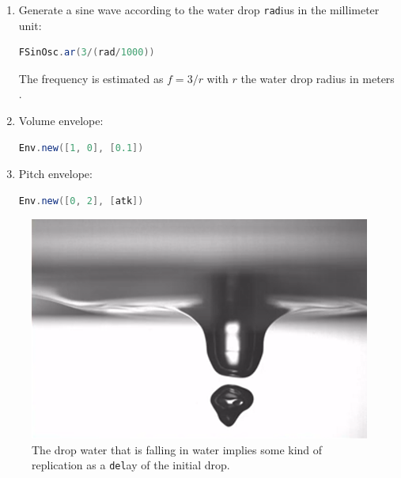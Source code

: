 \begin{enumerate}
  \item Generate a sine wave according to the water drop \texttt{rad}ius in the millimeter unit:
\begin{lstlisting}[basicstyle=\footnotesize\ttfamily,language=Java]
FSinOsc.ar(3/(rad/1000))
\end{lstlisting}  
The frequency is estimated as $f=3/r$ with $r$ the water drop radius in meters \citep{kvdd}.

  \item Volume envelope:
\begin{lstlisting}[basicstyle=\footnotesize\ttfamily,language=Java]  
Env.new([1, 0], [0.1])
\end{lstlisting}

  \item Pitch envelope:
\begin{lstlisting}[basicstyle=\footnotesize\ttfamily,language=Java]
Env.new([0, 2], [atk])
\end{lstlisting}
 
\end{enumerate}
   
\begin{figure}[H]
\begin{center}
\includegraphics[width=0.65\linewidth]{img/3187} 
\caption{ The drop water that is falling in water implies some kind of replication as a \texttt{del}ay of the initial drop.}
\label{dropwater}
\end{center}
\end{figure}
   
